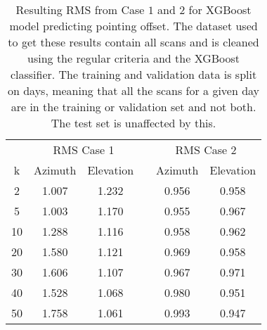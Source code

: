 \begin{table}[h]
    \centering %
    \caption{Resulting RMS from Case $1$ and $2$ for XGBoost model predicting pointing offset.
    The dataset used to get these results contain all scans and is cleaned using the regular criteria and the XGBoost classifier.
    The training and validation data is split on days, meaning that all the scans for a given day
    are in the training or validation set and not both. The test set is unaffected by this.}
    \begin{tabular}{ccc c cc}
        \toprule
        \multicolumn{1}{c}{} & \multicolumn{2}{c}{RMS Case 1} & & \multicolumn{2}{c}{RMS Case 2} \\
        \cmidrule(lr){2-3} \cmidrule(lr){5-6}
         k & Azimuth & Elevation & & Azimuth & Elevation \\
        \midrule
        2 &  1.007 &  1.232 & &  0.956 &  0.958 \\
        5 &  1.003 &  1.170 & &  0.955 &  0.967 \\
       10 &  1.288 &  1.116 & &  0.958 &  0.962 \\
       20 &  1.580 &  1.121 & &  0.969 &  0.958 \\
       30 &  1.606 &  1.107 & &  0.967 &  0.971 \\
       40 &  1.528 &  1.068 & &  0.980 &  0.951 \\
       50 &  1.758 &  1.061 & &  0.993 &  0.947 \\
        \bottomrule
    \end{tabular}
    \label{tab:results_all_days}
\end{table}

